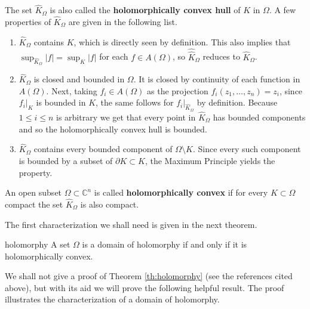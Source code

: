 The set $\widehat{K}_\Omega$ is also called the {\bf holomorphically convex hull} of $K$ in $\Omega$. A few properties of $\widehat{K}_\Omega$ are given in the following list. 

\begin{enumerate}
\item $\widehat{K}_\Omega$ contains $K$, which is directly seen by definition. This also implies that $\sup_{\widehat{K}_\Omega}|f|=\sup_K |f|$ for each $f\in A(\Omega)$, so $\widehat{\widehat{K}}_\Omega$ reduces to $\widehat{K}_\Omega$. \\
\item $\widehat{K}_\Omega$ is closed and bounded in $\Omega$. It is closed by continuity of each function in $A(\Omega)$. Next, taking $f_i\in A(\Omega)$ as the projection $f_i(z_1,\dots,z_n) = z_i$, since $f_i|_K$ is bounded in $K$, the same follows for $f_i|_{\widehat{K}_\Omega}$ by definition. Because $1\leq i\leq n$ is arbitrary we get that every point in $\widehat{K}_\Omega$ has bounded components and so the holomorphically convex hull is bounded.\\

\item $\widehat{K}_\Omega$ contains every bounded component of $\Omega\setminus K$. Since every such component is bounded by a subset of $\partial K \subset K$, the Maximum Principle \cite[Theorem 4, Chapter A]{gunning} yields the property.
\end{enumerate}

\begin{mydef}{}{}
An open subset $\Omega \subset \mathbb{C}^n$ is called {\bf holomorphically convex} if for every $K\subset \Omega$ compact the set $\widehat{K}_\Omega$ is also compact.
\end{mydef}

The first characterization we shall need is given in the next theorem.

\begin{mytheo}{}{holomorphy}
A set $\Omega$ is a domain of holomorphy if and only if it is holomorphically convex.
\end{mytheo}

We shall not give a proof of Theorem \ref{th:holomorphy} (see the references cited above), but with its aid we will prove the following helpful result. The proof illustrates the characterization of a domain of holomorphy.\\

